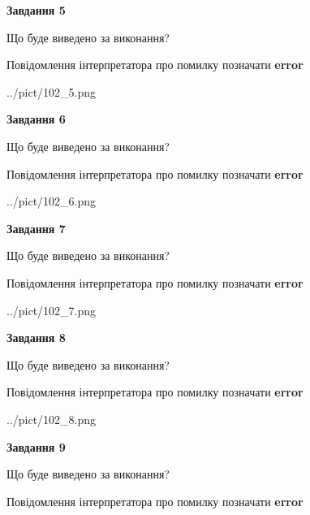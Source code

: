 \documentclass[11pt, ukrainian]{article}
\begin{document}
{\begin {large}
{\begin {center}\textbf{Завдання 5}\end {center}}\par
Що буде виведено за виконання? \par
Повідомлення інтерпретатора про помилку позначати \textbf{error}

\begin{center}
	{../pict/102_5.png}
\end{center}
\newpage

{\begin {center}\textbf{Завдання 6}\end {center}}\par
Що буде виведено за виконання? \par
Повідомлення інтерпретатора про помилку позначати \textbf{error}

\begin{center}
	{../pict/102_6.png}
\end{center}
\newpage

{\begin {center}\textbf{Завдання 7}\end {center}}\par
Що буде виведено за виконання? \par
Повідомлення інтерпретатора про помилку позначати \textbf{error}

\begin{center}
	{../pict/102_7.png}
\end{center}
\newpage

{\begin {center}\textbf{Завдання 8}\end {center}}\par
Що буде виведено за виконання? \par
Повідомлення інтерпретатора про помилку позначати \textbf{error}

\begin{center}
	{../pict/102_8.png}
\end{center}
\newpage

{\begin {center}\textbf{Завдання 9}\end {center}}\par
Що буде виведено за виконання? \par
Повідомлення інтерпретатора про помилку позначати \textbf{error}


\end{large}}
\end{document}
